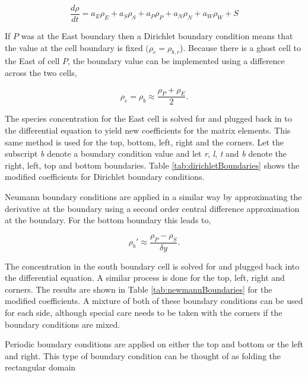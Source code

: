 \begin{equation}
    \frac{d\rho}{dt} = a_{E}\rho_{E} + a_{S}\rho_{S} + a_{P}\rho_{P} + a_{N}\rho_{N} + a_{W}\rho_{W} + S
\end{equation}

\noindent If $P$ was at the East boundary then a Dirichlet boundary condition means that the value at the cell boundary is fixed $(\rho_{e} = \rho_{b,r}$). Because there is a ghost cell to the East of cell $P$, the boundary value can be implemented using a difference across the two cells,

\begin{equation}
    \rho_{e} = \rho_{b} \approx \frac{\rho_{P} + \rho_{E}}{2}.
\end{equation}

\noindent The species concentration for the East cell is solved for and plugged back in to the differential equation to yield new coefficients for the matrix elements. This same method is used for the top, bottom, left, right and the corners. Let the subscript \textit{b} denote a boundary condition value and let \textit{r}, \textit{l}, \textit{t} and \textit{b} denote the right, left, top and bottom boundaries. Table \ref{tab:dirichletBoundaries} shows the modified coefficients for Dirichlet boundary conditions. 

Neumann boundary conditions are applied in a similar way by approximating the derivative at the boundary using a second order central difference approximation at the boundary. For the bottom boundary this leads to,

\begin{equation}
    \rho_{b}' \approx \frac{\rho_{P} - \rho_{S}}{\delta y}.
\end{equation}

\noindent The concentration in the south boundary cell is solved for and plugged back into the differential equation. A similar process is done for the top, left, right and corners. The results are shown in Table \ref{tab:newmannBoundaries} for the modified coefficients. A mixture of both of these boundary conditions can be used for each side, although special care needs to be taken with the corners if the boundary conditions are mixed. 

Periodic boundary conditions are applied on either the top and bottom or the left and right. This type of boundary condition can be thought of as folding the rectangular domain 

\clearpage

